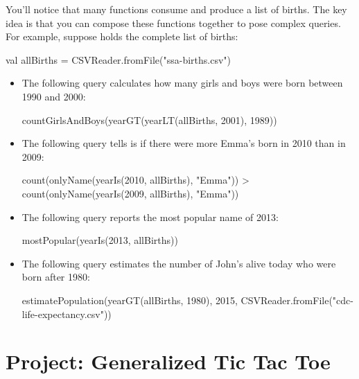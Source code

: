 \documentclass[9pt]{extbook}
\begin{document}
You'll notice that many functions
consume and produce a list of births. The key idea is that you can
compose these functions together to pose complex queries. For example,
suppose  holds the complete list of births:

\begin{scalacode}
val allBirths = CSVReader.fromFile("ssa-births.csv")
\end{scalacode}

\begin{itemize}

  \item The following query calculates how many girls and boys were born between 1990
  and 2000:

  \begin{scalacode}
  countGirlsAndBoys(yearGT(yearLT(allBirths, 2001), 1989))
  \end{scalacode}

  \item The following query tells is if there were more Emma's born in 2010 than
  in 2009:

  \begin{scalacode}
  count(onlyName(yearIs(2010, allBirths), "Emma")) > count(onlyName(yearIs(2009, allBirths), "Emma"))
  \end{scalacode}

  \item The following query reports the most popular name of 2013:

  \begin{scalacode}
  mostPopular(yearIs(2013, allBirths))
  \end{scalacode}

  \item The following query estimates the number of John's alive today who
  were born after 1980:

  \begin{scalacode}
  estimatePopulation(yearGT(allBirths, 1980), 2015, CSVReader.fromFile("cdc-life-expectancy.csv"))
  \end{scalacode}

\end{itemize}



\chapter{Project: Generalized Tic Tac Toe}
\end{document}
